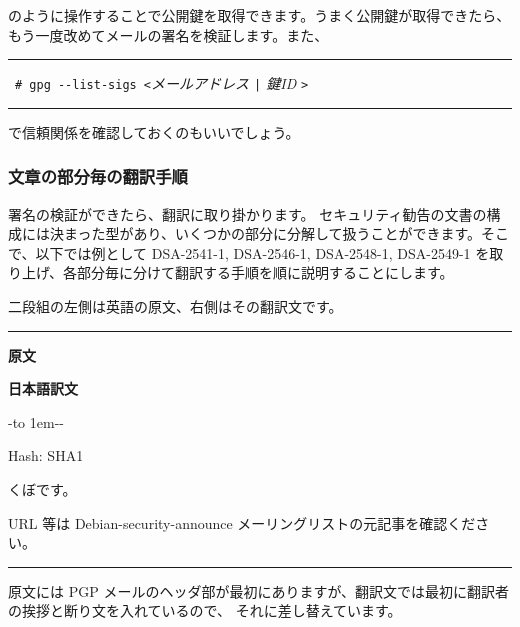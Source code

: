 \documentclass[mingoth,a4paper]{jsarticle}
\begin{document}
のように操作することで公開鍵を取得できます。うまく公開鍵が取得できたら、もう一度改めてメールの署名を検証します。また、

\hfil\begin{minipage}{0.9\linewidth}
\vspace*{1em}
\hrule
\vrule height1.7em depth 1em
\hfil{\ \verb+# gpg --list-sigs <+{\it メールアドレス \verb+|+ 鍵ID }\verb+>+
}\hfill\vrule height1.7em depth 1em
\hrule
\vspace*{1em}
\end{minipage}\hfil

で信頼関係を確認しておくのもいいでしょう。


\subsubsection{文章の部分毎の翻訳手順}

署名の検証ができたら、翻訳に取り掛かります。
セキュリティ勧告の文書の構成には決まった型があり、いくつかの部分に分解して扱うことができます。そこで、以下では例として DSA-2541-1, DSA-2546-1, DSA-2548-1, DSA-2549-1 を取り上げ、各部分毎に分けて翻訳する手順を順に説明することにします。



二段組の左側は英語の原文、右側はその翻訳文です。
\vspace{1ex}
\pagebreak[2]

\par

\hrule
\parbox[t]{0.48\linewidth}{{\bf 原文}}\hfil \parbox{0.48\linewidth}{\bf 日本語訳文}\par
-\leaders\hbox to 1em{\hss{}-\hss}\hfill -\par
\vspace{0.4em}
\parbox[t]{0.48\linewidth}{
Hash: SHA1\par\vfil
}\hfil
\parbox{0.48\linewidth}{
くぼです。\par
URL 等は Debian-security-announce メーリングリストの元記事を確認ください。\par
}
\hrule\par\vspace{1ex}

原文には PGP メールのヘッダ部が最初にありますが、翻訳文では最初に翻訳者の挨拶と断り文を入れているので、
それに差し替えています。

\vspace{1ex}
\end{document}
